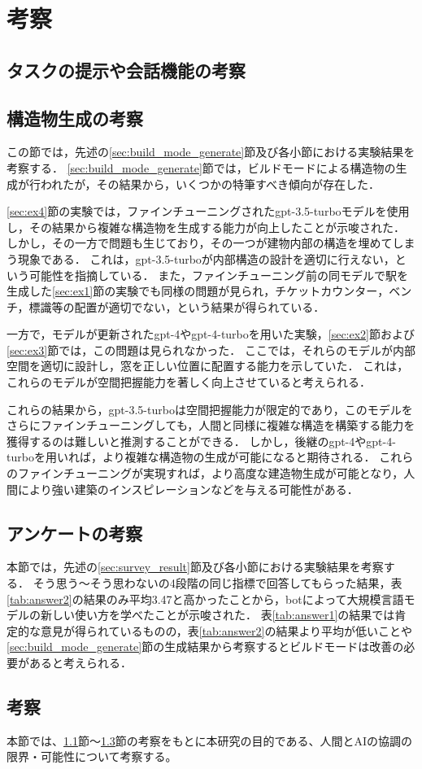 \chapter{考察}
\thispagestyle{plain}   %

\section{タスクの提示や会話機能の考察}\label{sec:gpt_res_investigation}


\section{構造物生成の考察}\label{sec:generate_investigation}
この節では，先述の\ref{sec:build_mode_generate}節及び各小節における実験結果を考察する．
\ref{sec:build_mode_generate}節では，ビルドモードによる構造物の生成が行われたが，その結果から，いくつかの特筆すべき傾向が存在した．

\ref{sec:ex4}節の実験では，ファインチューニングされたgpt-3.5-turboモデルを使用し，その結果から複雑な構造物を生成する能力が向上したことが示唆された．
しかし，その一方で問題も生じており，その一つが建物内部の構造を埋めてしまう現象である．
これは，gpt-3.5-turboが内部構造の設計を適切に行えない，という可能性を指摘している．
また，ファインチューニング前の同モデルで駅を生成した\ref{sec:ex1}節の実験でも同様の問題が見られ，チケットカウンター，ベンチ，標識等の配置が適切でない，という結果が得られている．

一方で，モデルが更新されたgpt-4やgpt-4-turboを用いた実験，\ref{sec:ex2}節および\ref{sec:ex3}節では，この問題は見られなかった．
ここでは，それらのモデルが内部空間を適切に設計し，窓を正しい位置に配置する能力を示していた．
これは，これらのモデルが空間把握能力を著しく向上させていると考えられる．

これらの結果から，gpt-3.5-turboは空間把握能力が限定的であり，このモデルをさらにファインチューニングしても，人間と同様に複雑な構造を構築する能力を獲得するのは難しいと推測することができる．
しかし，後継のgpt-4やgpt-4-turboを用いれば，より複雑な構造物の生成が可能になると期待される．
これらのファインチューニングが実現すれば，より高度な建造物生成が可能となり，人間により強い建築のインスピレーションなどを与える可能性がある．

\section{アンケートの考察}\label{sec:survey_investigation}
本節では，先述の\ref{sec:survey_result}節及び各小節における実験結果を考察する．
そう思う～そう思わないの4段階の同じ指標で回答してもらった結果，表\ref{tab:answer2}の結果のみ平均3.47と高かったことから，botによって大規模言語モデルの新しい使い方を学べたことが示唆された．
表\ref{tab:answer1}の結果では肯定的な意見が得られているものの，表\ref{tab:answer2}の結果より平均が低いことや\ref{sec:build_mode_generate}節の生成結果から考察するとビルドモードは改善の必要があると考えられる．

\section{考察}
本節では、\ref{sec:gpt_res_investigation}節～\ref{sec:survey_investigation}節の考察をもとに本研究の目的である、人間とAIの協調の限界・可能性について考察する。